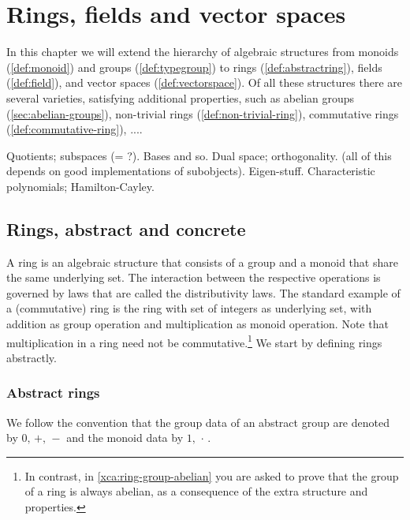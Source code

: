 \chapter{Rings, fields and vector spaces}
\label{ch:fields}

In this chapter we will extend the hierarchy of algebraic structures from 
monoids (\cref{def:monoid}) and 
groups (\cref{def:typegroup}) to
rings (\cref{def:abstractring}),
fields (\cref{def:field}), and
vector spaces (\cref{def:vectorspace}).
Of all these structures there are several varieties, 
satisfying additional properties, such as 
abelian groups (\cref{sec:abelian-groups}),
non-trivial rings (\cref{def:non-trivial-ring}),
commutative rings (\cref{def:commutative-ring}),
....

Quotients; subspaces (= ?). Bases and so. Dual space; orthogonality. (all of this depends on good implementations of subobjects). Eigen-stuff. Characteristic polynomials; Hamilton-Cayley.

\section{Rings, abstract and concrete}\label{sec:rings}

A ring is an algebraic structure that consists of a group and a
monoid that share the same underlying set. The interaction between
the respective operations is governed by laws that are called
the distributivity laws. 
The standard example of a (commutative) ring 
is the ring with set of integers as underlying set, with addition as
group operation and multiplication as monoid operation.
Note that multiplication in a ring need not be commutative.\footnote{%
In contrast, in \cref{xca:ring-group-abelian} you are asked to prove
that the group of a ring is always abelian, as a consequence of the
extra structure and properties.} We start by defining rings abstractly.

\subsection{Abstract rings}\label{sec:abstrings}

We follow the convention that the group data of an abstract group
are denoted by $0,\,+,\,-$ and the monoid data by $1,\,\cdot\,$.

